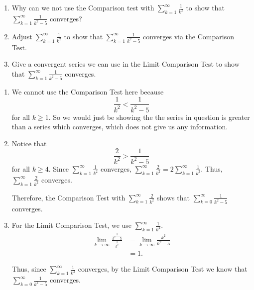 \documentclass[handout]{ximera}
\begin{document}
\begin{problem}
	\begin{enumerate}
	
	\item  Why can we not use the Comparison test with $\sum_{k=1}^\infty \frac{1}{k^2}$ to show that $\sum_{k=1}^\infty \frac{1}{k^2 - 5}$ converges?
	
	\item  Adjust $\sum_{k=1}^\infty \frac{1}{k^2}$ to show that $\sum_{k=1}^\infty \frac{1}{k^2 - 5}$ converges via the Comparison Test.
	
	\item  Give a convergent series we can use in the Limit Comparison Test to show that $\sum_{k=1}^\infty \frac{1}{k^2 - 5}$ converges.  
	
	\end{enumerate}
	
	\begin{freeResponse}
		\begin{enumerate}
		
		\item  We cannot use the Comparison Test here because 
			\[
			\frac{1}{k^2} < \frac{1}{k^2 - 5}
			\]
		for all $k \geq 1$.  So we would just be showing the the series in question is greater than a series which converges, which does not give us any information.
		
		
		
		\item  Notice that
			\[
			\frac{2}{k^2} > \frac{1}{k^2 - 5}
			\]
		for all $k \geq 4$.  
		Since $\sum_{k=1}^\infty \frac{1}{k^2}$ converges, $\sum_{k=1}^\infty \frac{2}{k^2} = 2 \sum_{k=1}^\infty \frac{1}{k^2}$.  
		Thus, $\sum_{k=1}^\infty \frac{2}{k^2}$ converges.
		
		Therefore, the Comparison Test with $\sum_{k=1}^\infty \frac{2}{k^2}$ shows that $\sum_{k=0}^\infty \frac{1}{k^2-5}$ converges.
		
		
		
		\item  For the Limit Comparison Test, we  use $\sum_{k=1}^\infty \frac{1}{k^2}$.  
			\begin{align*}
			\lim_{k \to \infty} \frac{\frac{1}{k^2-5}}{\frac{1}{k^2}}
			&= \lim_{k \to \infty} \frac{k^2}{k^2-5}  \\
			&= 1.
			\end{align*}
			
		Thus, since $\sum_{k=1}^\infty \frac{1}{k^2}$ converges, by the Limit Comparison Test we know that $\sum_{k=0}^\infty \frac{1}{k^2-5}$ converges.
		
		\end{enumerate}
	\end{freeResponse}

\end{problem}
\end{document}
